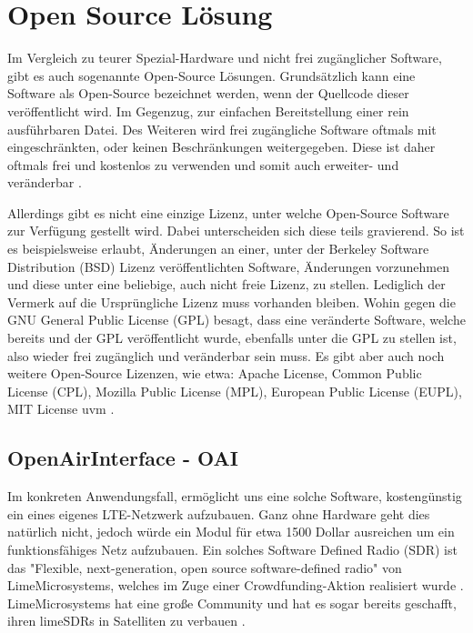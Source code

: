 
%
%
% 
% 
% 

\section{Open Source Lösung}
\label{sec:open_source}

Im Vergleich zu teurer Spezial-Hardware und nicht frei zugänglicher Software, gibt es auch sogenannte Open-Source Lösungen. Grundsätzlich kann eine Software als Open-Source bezeichnet werden, wenn der Quellcode dieser veröffentlicht wird. Im Gegenzug, zur einfachen Bereitstellung einer rein ausführbaren Datei.
Des Weiteren wird frei zugängliche Software oftmals mit eingeschränkten, oder keinen Beschränkungen weitergegeben. Diese ist daher oftmals frei und kostenlos zu verwenden und somit auch erweiter- und veränderbar \cite{gacek2004many}. 

Allerdings gibt es nicht eine einzige Lizenz, unter welche Open-Source Software zur Verfügung gestellt wird. Dabei unterscheiden sich diese teils gravierend. So ist es beispielsweise erlaubt, Änderungen an einer, unter der Berkeley Software Distribution (BSD) Lizenz veröffentlichten Software, Änderungen vorzunehmen und diese unter eine beliebige, auch nicht freie Lizenz, zu stellen. Lediglich der Vermerk auf die Ursprüngliche Lizenz muss vorhanden bleiben. Wohin gegen die GNU General Public License (GPL) besagt, dass eine veränderte Software, welche bereits und der GPL veröffentlicht wurde, ebenfalls unter die GPL zu stellen ist, also wieder frei zugänglich und veränderbar sein muss. Es gibt aber auch noch weitere Open-Source Lizenzen, wie etwa: Apache License, Common Public License (CPL), Mozilla Public License (MPL), European Public License (EUPL), MIT License uvm \cite{rosen2005open}.

\subsection{OpenAirInterface - OAI}
Im konkreten Anwendungsfall, ermöglicht uns eine solche Software, kostengünstig ein eines eigenes LTE-Netzwerk aufzubauen. 
Ganz ohne Hardware geht dies natürlich nicht, jedoch würde ein Modul für etwa 1500 Dollar ausreichen um ein funktionsfähiges Netz aufzubauen. Ein solches Software Defined Radio (SDR) ist das "Flexible, next-generation, open source software-defined radio" von LimeMicrosystems, welches im Zuge einer Crowdfunding-Aktion realisiert wurde \cite{CroudLime01}. 
LimeMicrosystems hat eine große Community und hat es sogar bereits geschafft, ihren limeSDRs in Satelliten zu verbauen \cite{limeHp}. 

